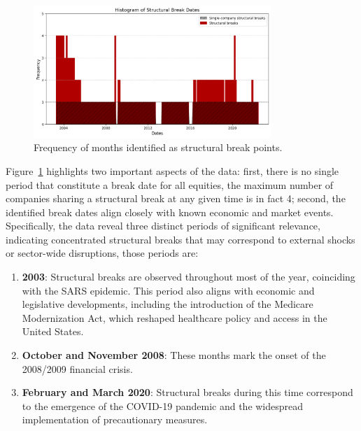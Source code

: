 \begin{figure}[h!]
    \centering
    \includegraphics[width=0.8\textwidth]{images/struct_break_freqs.png}
    \caption{Frequency of months identified as structural break points.}\label{fig:struct_break_freqs}
\end{figure}

Figure~\ref{fig:struct_break_freqs} highlights two important aspects of the data: 
first, there is no single period that constitute a break date for all equities, the maximum number of companies sharing a 
structural break at any given time is in fact 4; second, the identified break dates align closely with known economic and
market events.
Specifically, the data reveal three distinct periods of significant relevance, indicating concentrated structural breaks 
that may correspond to external shocks or sector-wide disruptions, those periods are:

\begin{enumerate}
    \item  \textbf{2003}: Structural breaks are observed throughout most of the year, coinciding with the SARS epidemic. 
    This period also aligns with economic and legislative developments, including the introduction of the Medicare
    Modernization Act, which reshaped healthcare policy and access in the United States.
    \item \textbf{October and November 2008}: These months mark the onset of the 2008/2009 financial crisis.
    \item \textbf{February and March 2020}: Structural breaks during this time correspond to the emergence of the COVID-19
    pandemic and the widespread implementation of precautionary measures.
\end{enumerate}

